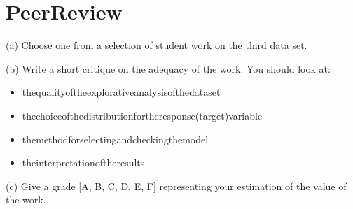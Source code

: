 \section{PeerReview}

(a) Choose one from a selection of student work on the third data set.

(b) Write a short critique on the adequacy of the work. You should look at:

\begin{itemize}
\item thequalityoftheexplorativeanalysisofthedataset
\item thechoiceofthedistributionfortheresponse(target)variable 
\item  themethodforselectingandcheckingthemodel
\item  theinterpretationoftheresults
\end{itemize}

(c) Give a grade [A, B, C, D, E, F] representing your estimation of the value of the work.


